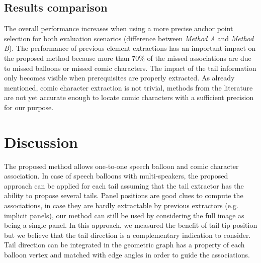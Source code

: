 \documentclass[conference]{IEEEtran}
\begin{document}
\subsection{Results comparison} %
\label{sub:result_comparison}

The overall performance increases when using a more precise anchor point selection for both evaluation scenarios (difference between \emph{Method A} and \emph{Method B}).
The performance of previous element extractions has an important impact on the proposed method because more than 70\% of the missed associations are due to missed balloons or missed comic characters.
The impact of the tail information only becomes visible when prerequisites are properly extracted.
As already mentioned, comic character extraction is not trivial, methods from the literature are not yet accurate enough to locate comic characters with a sufficient precision for our purpose.


\section{Discussion}
\label{sec:discussion}


The proposed method allows one-to-one speech balloon and comic character association.
In case of speech balloons with multi-speakers, the proposed approach can be applied for each tail assuming that the tail extractor has the ability to propose several tails.
Panel positions are good clues to compute the associations, in case they are hardly extractable by previous extractors (e.g. implicit panels), our method can still be used by considering the full image as being a single panel.
In this approach, we measured the benefit of tail tip position but we believe that the tail direction is a complementary indication to consider.
Tail direction can be integrated in the geometric graph has a property of each balloon vertex and matched with edge angles in order to guide the associations.
\end{document}
